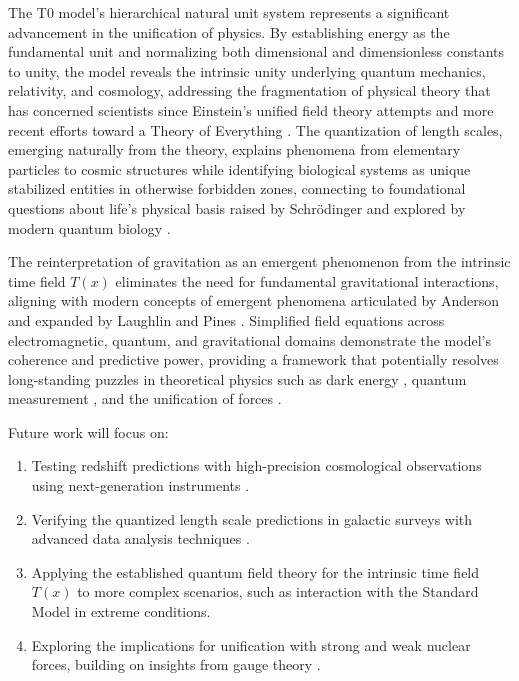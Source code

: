 \documentclass[twocolumn,aps,prl]{revtex4-2}
\begin{document}
	The T0 model’s hierarchical natural unit system represents a significant advancement in the unification of physics. By establishing energy as the fundamental unit and normalizing both dimensional and dimensionless constants to unity, the model reveals the intrinsic unity underlying quantum mechanics, relativity, and cosmology, addressing the fragmentation of physical theory that has concerned scientists since Einstein’s unified field theory attempts \cite{Einstein1921} and more recent efforts toward a Theory of Everything \cite{Hawking2010}. The quantization of length scales, emerging naturally from the theory, explains phenomena from elementary particles to cosmic structures while identifying biological systems as unique stabilized entities in otherwise forbidden zones, connecting to foundational questions about life’s physical basis raised by Schrödinger \cite{Schrodinger1944} and explored by modern quantum biology \cite{Lambert2013}.
	
	The reinterpretation of gravitation as an emergent phenomenon from the intrinsic time field $T(x)$ eliminates the need for fundamental gravitational interactions, aligning with modern concepts of emergent phenomena articulated by Anderson \cite{Anderson1972} and expanded by Laughlin and Pines \cite{Laughlin2000}. Simplified field equations across electromagnetic, quantum, and gravitational domains demonstrate the model’s coherence and predictive power, providing a framework that potentially resolves long-standing puzzles in theoretical physics such as dark energy \cite{Riess1998}, quantum measurement \cite{Zurek2003}, and the unification of forces \cite{Georgi1974}.
	
	Future work will focus on:
	\begin{enumerate}
		\item Testing redshift predictions with high-precision cosmological observations using next-generation instruments \cite{LSST2009}.
		\item Verifying the quantized length scale predictions in galactic surveys with advanced data analysis techniques \cite{Scargle2013}.
		\item Applying the established quantum field theory for the intrinsic time field $T(x)$ \cite{pascher_qft_2025} to more complex scenarios, such as interaction with the Standard Model in extreme conditions.
		\item Exploring the implications for unification with strong and weak nuclear forces, building on insights from gauge theory \cite{Yang1954}.
	\end{enumerate}
	
\end{document}
